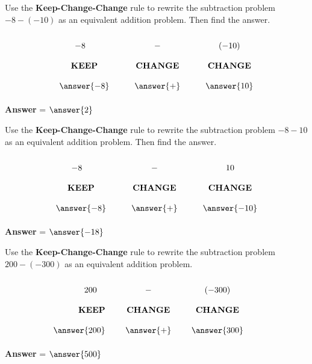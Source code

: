 \documentclass{ximera}[font=12pt]
\begin{document}
\begin{problem} 
    Use the \textbf{Keep-Change-Change} rule to rewrite the subtraction problem $-8 -(-10)$ as an equivalent addition problem. Then find the answer.

    \[ 
    \renewcommand{\arraystretch}{2} 
    \begin{array}{c @{\hskip 30pt} c @{\hskip 30pt} c} 
    -8 \quad & - & (-10) \\ 
    \textbf{KEEP} & \textbf{CHANGE} & \textbf{CHANGE} \\ 
    \answer{-8} & \answer{+}   & \answer{10} 
    \end{array} 
    \] 

    \textcolor{orange!80!black}{\textbf{Answer}} = $\answer{2}$ 
\end{problem}


\begin{problem} Use the \textbf{Keep-Change-Change} rule to rewrite the subtraction problem $-8-10$ as an 
equivalent addition problem. Then find the answer.

\[ 
\renewcommand{\arraystretch}{2} 
\begin{array}{c @{\hskip 30pt} c @{\hskip 30pt} c} 
-8 \quad & - & 10 \\ 
\textbf{KEEP} & \textbf{CHANGE} & \textbf{CHANGE} \\ 
\answer{-8} & \answer{+}   & \answer{-10} 
\end{array} 
\] 

\textcolor{orange!80!black}{\textbf{Answer}} = $\answer{-18}$ 
\end{problem}


\begin{problem}
    Use the \textbf{Keep-Change-Change} rule to rewrite the subtraction problem $200 -(-300)$ as an equivalent 
    addition problem.  

    \[
    \renewcommand{\arraystretch}{2}
    \begin{array}{r @{\hskip 24pt} c @{\hskip 24pt} c @{\hskip 24pt} c}
    200 \quad & - & (-300) \\
    \textbf{KEEP} & \textbf{CHANGE} & \textbf{CHANGE} \\
    \answer{200} & \answer{+} & \answer{300}
    \end{array}
    \]

\textcolor{orange!80!black}{\textbf{Answer}} = $\answer{500}$
                                                   
\end{problem}    
\end{document}

